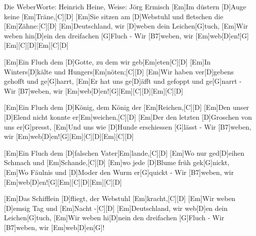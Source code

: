 \documentclass[../main.tex]{subfiles}
\begin{document}
\begin{song}{Die Weber}{Worte: Heinrich Heine, Weise: Jörg Ermisch}{}
[Em]Im düstern [D]Auge keine [Em]Träne,[C]{\hh}[D]{\hh}
[Em]Sie sitzen am [D]Webstuhl und fletschen die [Em]Zähne:[C]{\hh}[D]{\hh}
[Em]Deutschland, wir [D]weben dein Leichen[G]tuch,
[Em]Wir weben hin[D]ein den dreifachen [G]Fluch -
Wir [B7]weben, wir [Em]web[D]en![G]{\hh}[Em]{\hh}[C]{\hh}[D]{\hh}[Em]{\hh}[C]{\hh}[D]{\hh}

[Em]Ein Fluch dem [D]Gotte, zu dem wir geb[Em]eten[C]{\hh}[D]{\hh}
[Em]In Winters[D]kälte und Hungers[Em]nöten;[C]{\hh}[D]{\hh}
[Em]Wir haben ver[D]gebens gehofft und ge[G]harrt,
[Em]Er hat uns ge[D]{ä}fft und gefoppt und ge[G]narrt -
Wir [B7]weben, wir [Em]web[D]en![G]{\hh}[Em]{\hh}[C]{\hh}[D]{\hh}[Em]{\hh}[C]{\hh}[D]{\hh}

[Em]Ein Fluch dem [D]König, dem König der [Em]Reichen,[C]{\hh}[D]{\hh}
[Em]Den unser [D]Elend nicht konnte er[Em]weichen,[C]{\hh}[D]{\hh}
[Em]Der den letzten [D]Groschen von uns er[G]presst,
[Em]Und uns wie [D]Hunde erschiessen [G]lässt -
Wir [B7]weben, wir [Em]web[D]en![G]{\hh}[Em]{\hh}[C]{\hh}[D]{\hh}[Em]{\hh}[C]{\hh}[D]{\hh}

[Em]Ein Fluch dem [D]falschen Vater[Em]lande,[C]{\hh}[D]{\hh}
[Em]Wo nur ged[D]eihen Schmach und [Em]Schande,[C]{\hh}[D]{\hh}
[Em]wo jede [D]Blume früh gek[G]nickt,
[Em]Wo Fäulnis und [D]Moder den Wurm er[G]quickt -
Wir [B7]weben, wir [Em]web[D]en![G]{\hh}[Em]{\hh}[C]{\hh}[D]{\hh}[Em]{\hh}[C]{\hh}[D]{\hh}

[Em]Das Schifflein [D]fliegt, der Webstuhl [Em]kracht,[C]{\hh}[D]{\hh}
[Em]Wir weben [D]emsig Tag und [Em]Nacht -[C]{\hh}[D]{\hh}
[Em]Deutschland, wir web[D]en dein Leichen[G]tuch,
[Em]Wir weben hi[D]nein den dreifachen [G]Fluch -
Wir [B7]weben, wir [Em]web[D]en[G]!

\end{song}
\end{document}
